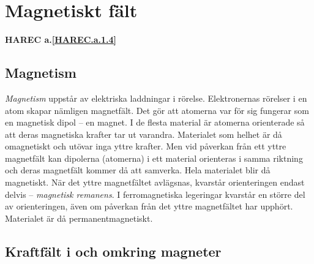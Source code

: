 \section{Magnetiskt fält}
\textbf{HAREC a.\ref{HAREC.a.1.4}\label{myHAREC.a.1.4}}
\label{elektromagnetiskafält}

\subsection{Magnetism}


\emph{Magnetism} uppstår av elektriska laddningar i rörelse.
Elektronernas rörelser i en atom skapar nämligen magnetfält.
Det gör att atomerna var för sig fungerar som en magnetisk dipol -- en magnet.
I de flesta material är atomerna orienterade så att deras magnetiska krafter
tar ut varandra.
Materialet som helhet är då omagnetiskt och utövar inga yttre krafter.
Men vid påverkan från ett yttre magnetfält kan dipolerna (atomerna) i ett
material orienteras i samma riktning och deras magnetfält kommer då att
samverka. Hela materialet blir då magnetiskt.
När det yttre magnetfältet avlägsnas, kvarstår orienteringen endast delvis --
\emph{magnetisk remanens}.
I ferromagnetiska legeringar kvarstår en större del av orienteringen, även om
påverkan från det yttre magnetfältet har upphört.
Materialet är då permanentmagnetiskt.

\subsection{Kraftfält i och omkring magneter}

